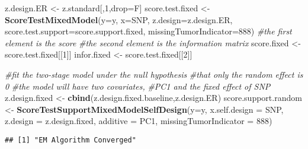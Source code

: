 \documentclass[11pt,]{article}
\newenvironment{Shaded}{\begin{snugshade}}{\end{snugshade}}
\newcommand{\CommentTok}[1]{\textcolor[rgb]{0.56,0.35,0.01}{\textit{#1}}}
\newcommand{\DataTypeTok}[1]{\textcolor[rgb]{0.13,0.29,0.53}{#1}}
\newcommand{\DecValTok}[1]{\textcolor[rgb]{0.00,0.00,0.81}{#1}}
\newcommand{\KeywordTok}[1]{\textcolor[rgb]{0.13,0.29,0.53}{\textbf{#1}}}
\newcommand{\NormalTok}[1]{#1}
\newcommand{\StringTok}[1]{\textcolor[rgb]{0.31,0.60,0.02}{#1}}
\begin{document}
\begin{Shaded}
\begin{Highlighting}[]
\NormalTok{z.design.ER <-}\StringTok{ }\NormalTok{z.standard[,}\DecValTok{1}\NormalTok{,drop=F]}
\NormalTok{score.test.fixed <-}\StringTok{ }\KeywordTok{ScoreTestMixedModel}\NormalTok{(}\DataTypeTok{y=}\NormalTok{y,}
                    \DataTypeTok{x=}\NormalTok{SNP,}
                    \DataTypeTok{z.design=}\NormalTok{z.design.ER,}
                    \DataTypeTok{score.test.support=}\NormalTok{score.support.fixed,}
                    \DataTypeTok{missingTumorIndicator=}\DecValTok{888}\NormalTok{)}
\CommentTok{#the first element is the score}
\CommentTok{#the second element is the information matrix}
\NormalTok{score.fixed <-}\StringTok{ }\NormalTok{score.test.fixed[[}\DecValTok{1}\NormalTok{]]}
\NormalTok{infor.fixed <-}\StringTok{ }\NormalTok{score.test.fixed[[}\DecValTok{2}\NormalTok{]]}

\CommentTok{#fit the two-stage model under the null hypothesis}
\CommentTok{#that only the random effect is 0}
\CommentTok{#the model will have two covariates, }
\CommentTok{#PC1 and the fixed effect of SNP}
\NormalTok{z.design.fixed <-}\StringTok{ }\KeywordTok{cbind}\NormalTok{(z.design.fixed.baseline,z.design.ER)}
\NormalTok{score.support.random <-}\StringTok{ }\KeywordTok{ScoreTestSupportMixedModelSelfDesign}\NormalTok{(}\DataTypeTok{y=}\NormalTok{y,}
                        \DataTypeTok{x.self.design  =}\NormalTok{ SNP,}
                        \DataTypeTok{z.design =}\NormalTok{ z.design.fixed,}
                        \DataTypeTok{additive =}\NormalTok{ PC1,}
                        \DataTypeTok{missingTumorIndicator =} \DecValTok{888}\NormalTok{)}
\end{Highlighting}
\end{Shaded}

\begin{verbatim}
## [1] "EM Algorithm Converged"
\end{verbatim}
\end{document}
